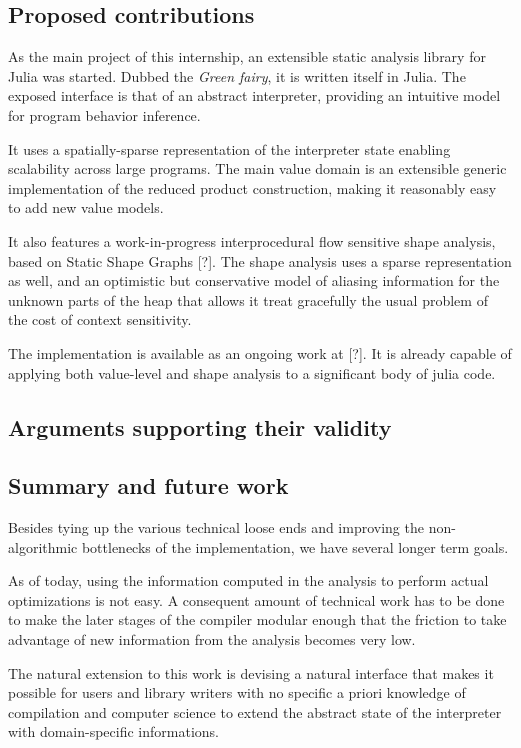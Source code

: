 \documentclass[14pt]{article}
\begin{document}
\subsection*{Proposed contributions}

As the main project of this internship, an extensible static analysis library for Julia was started. Dubbed the \emph{Green fairy}, it is written itself in Julia. The exposed interface is that of an abstract interpreter, providing an intuitive model for program behavior inference.

It uses a spatially-sparse representation of the interpreter state enabling scalability across large programs. The main value domain is an extensible generic implementation of the reduced product construction, making it reasonably easy to add new value models.

It also features a work-in-progress interprocedural flow sensitive shape analysis, based on Static Shape Graphs [?]. The shape analysis uses a sparse representation as well, and an optimistic but conservative model of aliasing information for the unknown parts of the heap that allows it treat gracefully the usual problem of the cost of context sensitivity.

The implementation is available as an ongoing work at [?]. It is already capable of applying both value-level and shape analysis to a significant body of julia code.

\subsection*{Arguments supporting their validity}



\subsection*{Summary and future work}

Besides tying up the various technical loose ends and improving the non-algorithmic bottlenecks of the implementation, we have several longer term goals.

As of today, using the information computed in the analysis to perform actual optimizations is not easy.
A consequent amount of technical work has to be done to make the later stages of the compiler modular enough that the friction to take advantage of new information from the analysis becomes very low.

The natural extension to this work is devising a natural interface that makes it possible for users and library writers with no specific a priori knowledge of compilation and computer science to extend the abstract state of the interpreter with domain-specific informations.
\end{document}
